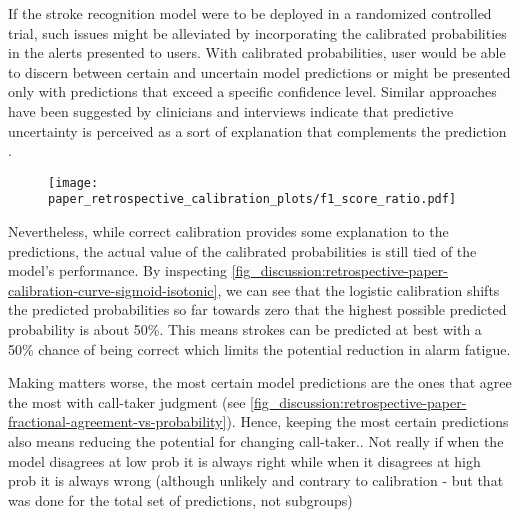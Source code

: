 If the stroke recognition model were to be deployed in a randomized controlled trial, such issues might be alleviated by incorporating the calibrated probabilities in the alerts presented to users. With calibrated probabilities, user would be able to discern between certain and uncertain model predictions or might be presented only with predictions that exceed a specific confidence level. Similar approaches have been suggested by clinicians and interviews indicate that predictive uncertainty is perceived as a sort of explanation that complements the prediction \cite{tonekaboni_what_2019}.


\begin{figure}
    \centering
    \texttt{[image: paper\_retrospective\_calibration\_plots/f1\_score\_ratio.pdf]}
    \caption[]{}
    \label{fig_discussion:retrospective-paper-f1-score-ratio}
\end{figure}


Nevertheless, while correct calibration provides some explanation to the predictions, the actual value of the calibrated probabilities is still tied of the model's performance. By inspecting \cref{fig_discussion:retrospective-paper-calibration-curve-sigmoid-isotonic}, we can see that the logistic calibration shifts the predicted probabilities so far towards zero that the highest possible predicted probability is about 50\%. This means strokes can be predicted at best with a 50\% chance of being correct which limits the potential reduction in alarm fatigue. 



Making matters worse, the most certain model predictions are the ones that agree the most with call-taker judgment (see \cref{fig_discussion:retrospective-paper-fractional-agreement-vs-probability}). Hence, keeping the most certain predictions also means reducing the potential for changing call-taker.. Not really if when the model disagrees at low prob it is always right while when it disagrees at high prob it is always wrong (although unlikely and contrary to calibration - but that was done for the total set of predictions, not subgroups)


